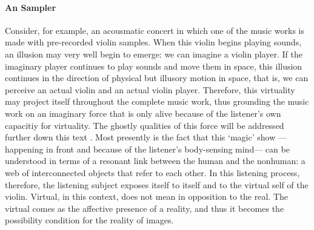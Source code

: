 \paragraph{An Sampler}
Consider, for example, an acousmatic concert in which one of the music works is made with pre-recorded violin samples. When this violin begins playing sounds, an illusion may very well begin to emerge: we can imagine a violin player. If the imaginary player continues to play sounds and move them in space, this illusion continues in the direction of physical but illusory motion in space, that is, we can perceive an actual violin and an actual violin player. Therefore, this virtuality may project itself throughout the complete music work, thus grounding the music work on an imaginary force that is only alive because of the listener's own capacitiy for virtuality. The ghostly qualities of this force will be addressed further down this text . Most presently is the fact that this `magic' show ---happening in front and because of the listener's body-sensing mind--- can be understood in terms of a resonant link between the human and the nonhuman: a web of interconnected objects that refer to each other. In this listening process, therefore, the listening subject exposes itself to itself and to the virtual self of the violin. Virtual, in this context, does not mean in opposition to the real. The virtual comes as the affective presence of a reality, and thus it becomes the possibility condition for the reality of images. 

